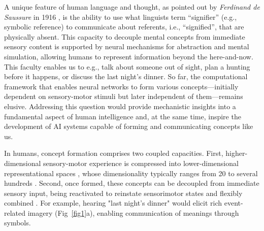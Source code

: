 \documentclass[pdflatex,sn-mathphys-num,lineno]{sn-jnl}%
\begin{document}
\begin{CJK}{UTF8}{gbsn}
A unique feature of human language and thought, as pointed out by \textit{Ferdinand de Saussure} in 1916 \cite{de1916course}, is the ability to use what linguists term “signifier” (e.g., symbolic reference) to communicate about referents, i.e., “signified”, that are physically absent. This capacity to decouple mental concepts from immediate sensory content is supported by neural mechanisms for abstraction and mental simulation, allowing humans to represent information beyond the here-and-now. This faculty enables us to e.g., talk about someone out of sight, plan a hunting before it happens, or discuss the last night’s dinner. So far, the computational framework that enables neural networks to form various concepts—initially dependent on sensory-motor stimuli but later independent of them—remains elusive. Addressing this question would provide mechanistic insights into a fundamental aspect of human intelligence and, at the same time, inspire the development of AI systems capable of forming and communicating concepts like us.

In humans, concept formation comprises two coupled capacities. First, higher-dimensional sensory-motor experience is compressed into lower-dimensional representational spaces \cite{piantadosi_why_2024,grill-spector_functional_2014,binder_neurobiology_2011,ralph_neural_2017}, whose dimensionality typically ranges from 20 to several hundreds \cite{mcrae_semantic_2005,devereux_centre_2014,binder_toward_2016,hebart_revealing_2020,haxby_common_2011}. Second, once formed, these concepts can be decoupled from immediate sensory input, being reactivated to reinstate sensorimotor states and flexibly combined  \cite{pulvermuller_brain_2005,kiefer_conceptual_2012,huth_natural_2016,barsalou_grounded_2008,martin_grapesgrounding_2016,ralph_neural_2017}. For example, hearing "last night's dinner" would elicit rich event-related imagery (Fig~\ref{fig1}a), enabling communication of meanings through symbols.


\end{CJK}
\end{document}
